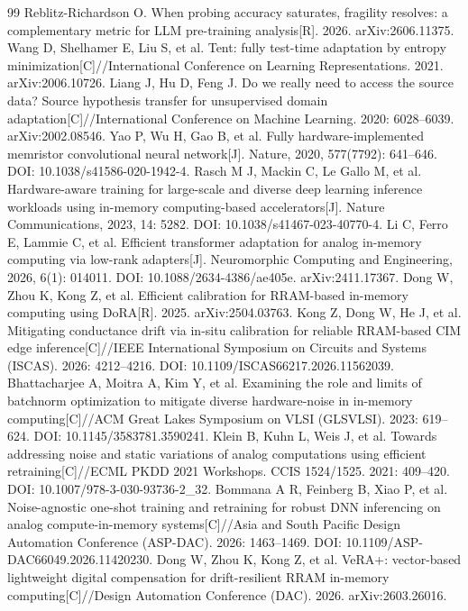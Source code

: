 \documentclass[11pt,a4paper]{ctexart}
\begin{document}
\begin{thebibliography}{99}
 Reblitz-Richardson O. When probing accuracy saturates, fragility resolves: a complementary metric for LLM pre-training analysis[R]. 2026. arXiv:2606.11375.
 Wang D, Shelhamer E, Liu S, et al. Tent: fully test-time adaptation by entropy minimization[C]//International Conference on Learning Representations. 2021. arXiv:2006.10726.
 Liang J, Hu D, Feng J. Do we really need to access the source data? Source hypothesis transfer for unsupervised domain adaptation[C]//International Conference on Machine Learning. 2020: 6028--6039. arXiv:2002.08546.
 Yao P, Wu H, Gao B, et al. Fully hardware-implemented memristor convolutional neural network[J]. Nature, 2020, 577(7792): 641--646. DOI: 10.1038/s41586-020-1942-4.
 Rasch M J, Mackin C, Le Gallo M, et al. Hardware-aware training for large-scale and diverse deep learning inference workloads using in-memory computing-based accelerators[J]. Nature Communications, 2023, 14: 5282. DOI: 10.1038/s41467-023-40770-4.
 Li C, Ferro E, Lammie C, et al. Efficient transformer adaptation for analog in-memory computing via low-rank adapters[J]. Neuromorphic Computing and Engineering, 2026, 6(1): 014011. DOI: 10.1088/2634-4386/ae405e. arXiv:2411.17367.
 Dong W, Zhou K, Kong Z, et al. Efficient calibration for RRAM-based in-memory computing using DoRA[R]. 2025. arXiv:2504.03763.
 Kong Z, Dong W, He J, et al. Mitigating conductance drift via in-situ calibration for reliable RRAM-based CIM edge inference[C]//IEEE International Symposium on Circuits and Systems (ISCAS). 2026: 4212--4216. DOI: 10.1109/ISCAS66217.2026.11562039.
 Bhattacharjee A, Moitra A, Kim Y, et al. Examining the role and limits of batchnorm optimization to mitigate diverse hardware-noise in in-memory computing[C]//ACM Great Lakes Symposium on VLSI (GLSVLSI). 2023: 619--624. DOI: 10.1145/3583781.3590241.
 Klein B, Kuhn L, Weis J, et al. Towards addressing noise and static variations of analog computations using efficient retraining[C]//ECML PKDD 2021 Workshops. CCIS 1524/1525. 2021: 409--420. DOI: 10.1007/978-3-030-93736-2\_32.
 Bommana A R, Feinberg B, Xiao P, et al. Noise-agnostic one-shot training and retraining for robust DNN inferencing on analog compute-in-memory systems[C]//Asia and South Pacific Design Automation Conference (ASP-DAC). 2026: 1463--1469. DOI: 10.1109/ASP-DAC66049.2026.11420230.
 Dong W, Zhou K, Kong Z, et al. VeRA+: vector-based lightweight digital compensation for drift-resilient RRAM in-memory computing[C]//Design Automation Conference (DAC). 2026. arXiv:2603.26016.
\end{thebibliography}
\end{document}
